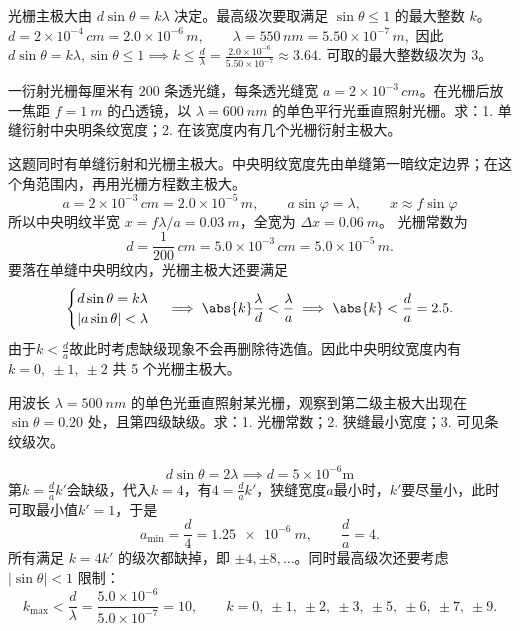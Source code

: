\begin{solution}
光栅主极大由 \(d\sin\theta=k\lambda\) 决定。最高级次要取满足 \(\sin\theta\le1\) 的最大整数 \(k\)。
 \(d=2\times10^{-4}\,\si{cm}=2.0\times10^{-6}\,\si{m}, \qquad \lambda=550\,\si{nm}=5.50\times10^{-7}\,\si{m},\) 
因此
 \(d\sin\theta=k\lambda,\sin\theta\le1 \implies k\le\frac{d}{\lambda} =\frac{2.0\times10^{-6}}{5.50\times10^{-7}}\approx3.64.\) 
可取的最大整数级次为 \(3\)。
\end{solution}

\begin{exercise}
一衍射光栅每厘米有 \(200\) 条透光缝，每条透光缝宽 \(a=2\times10^{-3}\,\si{cm}\)。在光栅后放一焦距 \(f=\SI{1}{m}\) 的凸透镜，以 \(\lambda=\SI{600}{nm}\) 的单色平行光垂直照射光栅。求：1. 单缝衍射中央明条纹宽度；2. 在该宽度内有几个光栅衍射主极大。
\end{exercise}

\begin{solution}
这题同时有单缝衍射和光栅主极大。中央明纹宽度先由单缝第一暗纹定边界；在这个角范围内，再用光栅方程数主极大。
\[
a=2\times10^{-3}\,\si{cm}=2.0\times10^{-5}\,\si{m},\qquad
a\sin\varphi=\lambda,\qquad
x\approx f\sin\varphi
\]
所以中央明纹半宽 \(x=f\lambda/a=\SI{0.03}{m}\)，全宽为 \(\Delta x=\SI{0.06}{m}\)。
光栅常数为
\[
d=\frac{1}{200}\,\si{cm}=5.0\times10^{-3}\,\si{cm}=5.0\times10^{-5}\,\si{m}.
\]
要落在单缝中央明纹内，光栅主极大还要满足
 \[\begin{cases}d\sin\theta=k\lambda\\|a\sin\theta|<\lambda\end{cases} \implies \abs{k}\frac{\lambda}{d}<\frac{\lambda}{a} \implies \abs{k}<\frac{d}{a}=2.5.\]
由于$k<\frac{d}{a}$故此时考虑缺级现象不会再删除待选值。因此中央明纹宽度内有 \(k=0,\ \pm1,\ \pm2\) 共 5 个光栅主极大。
\end{solution}

\begin{exercise}
用波长 \(\lambda=\SI{500}{nm}\) 的单色光垂直照射某光栅，观察到第二级主极大出现在 \(\sin\theta=0.20\) 处，且第四级缺级。求：1. 光栅常数；2. 狭缝最小宽度；3. 可见条纹级次。
\end{exercise}

\begin{solution}
\[d\sin\theta=2\lambda\implies d=5\times10^{-6}\text{m}\]
第$k=\frac{d}{a}k'$会缺级，代入$k=4$，有$4=\frac{d}{a}k'$，狭缝宽度$a$最小时，$k'$要尽量小，此时可取最小值$k'=1$，于是
 \[a_{\min}=\frac{d}{4}=\SI{1.25e-6}{m},\qquad \frac{d}{a}=4.\] 
所有满足 \(k=4k'\) 的级次都缺掉，即 \(\pm4,\pm8,\dots\)。同时最高级次还要考虑 \(|\sin\theta|<1\) 限制：
 \[k_{\max}<\frac{d}{\lambda} =\frac{5.0\times10^{-6}}{5.0\times10^{-7}}=10, \qquad k=0,\ \pm1,\ \pm2,\ \pm3,\ \pm5,\ \pm6,\ \pm7,\ \pm9.\]
\end{solution}


